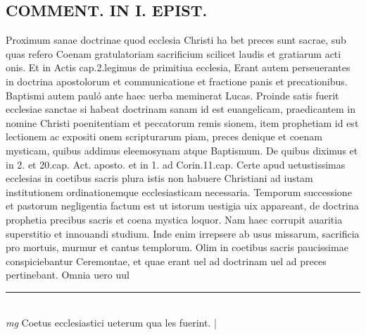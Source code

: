 \documentclass{article}
\begin{document}
\begin{pages}
\section*{COMMENT. IN I. EPIST. }\pstart Proximum sanae doctrinae quod ecclesia Christi ha bet preces sunt sacrae, sub quas refero Coenam gratulatoriam sacrificium scilicet laudis et gratiarum acti onis. Et in Actis cap.2.legimus de primitiua ecclesia, Erant autem perseuerantes in doctrina apostolorum et communicatione et fractione panis et precationibus. Baptismi autem pauló ante haec uerba meminerat Lucas. Proinde satis fuerit ecclesiae sanctae si habeat doctrinam sanam id est euangelicam, praedicantem in nomine Christi poenitentiam et peccatorum remis sionem, item prophetiam id est lectionem ac expositi onem scripturarum piam, preces denique et coenam mysticam, quibus addimus eleemosynam atque Baptismum. De quibus diximus et in 2. et 20.cap. Act. aposto. et in 1. ad Corin.11.cap. Certe apud uetustissimas ecclesias in coetibus sacris plura istis non habuere Christiani ad iustam institutionem ordinationemque ecclesiasticam necessaria. Temporum successione et pastorum negligentia factum est ut istorum uestigia uix appareant, de doctrina prophetia precibus sacris et coena mystica loquor. Nam haec corrupit auaritia superstitio et innouandi studium. Inde enim irrepsere ab usus missarum, sacrificia pro mortuis, murmur et cantus templorum. Olim in coetibus sacris paucissimae conspiciebantur Ceremontae, et quae erant uel ad doctrinam uel ad preces pertinebant. Omnia uero uul\pend
\vspace{0.5cm}\noindent
\vspace{0.2cm}\rule{1cm}{0.2pt}\\ 
\hspace{0.2cm}\textit{mg}
\footnotesize Coetus ecclesiastici ueterum qua les fuerint. 
\normalsize| 

\end{pages}
\end{document}
